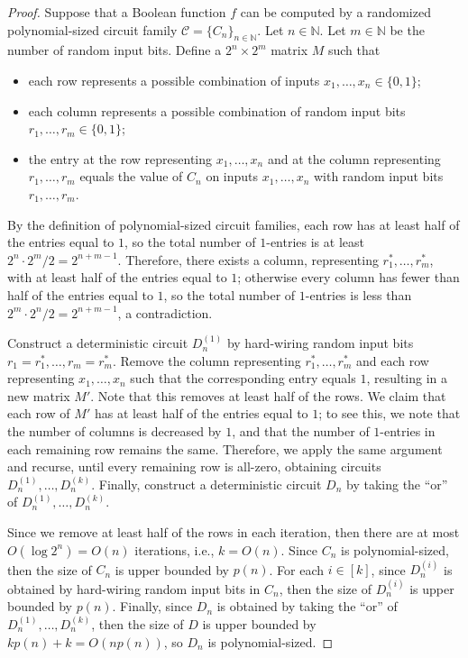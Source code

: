 \documentclass[letterpaper, reqno,11pt]{article}
\newcommand{\NN}{\mathbb{N}}
\begin{document}
\begin{enumerate}
  \begin{proof}
    Suppose that a Boolean function $f$ can be computed by a randomized polynomial-sized circuit family $\mathcal C = \{ C_n \}_{n \in \NN}$. Let $n \in \NN$. Let $m \in \NN$ be the number of random input bits. Define a $2^n \times 2^m$ matrix $M$ such that
    \begin{itemize}[itemsep=0pt]
      \item each row represents a possible combination of inputs $x_1, \ldots, x_n \in \{ 0, 1 \}$;
      \item each column represents a possible combination of random input bits $r_1, \ldots, r_m \in \{ 0, 1 \}$;
      \item the entry at the row representing $x_1, \ldots, x_n$ and at the column representing $r_1, \ldots, r_m$ equals the value of $C_n$ on inputs $x_1, \ldots, x_n$ with random input bits $r_1, \ldots, r_m$.
    \end{itemize}
    By the definition of polynomial-sized circuit families, each row has at least half of the entries equal to $1$, so the total number of $1$-entries is at least $2^n \cdot 2^m/2 = 2^{n + m - 1}$. Therefore, there exists a column, representing $r_1^*, \ldots, r_m^*$, with at least half of the entries equal to $1$; otherwise every column has fewer than half of the entries equal to $1$, so the total number of $1$-entries is less than $2^m \cdot 2^n/2 = 2^{n + m - 1}$, a contradiction.

    Construct a deterministic circuit $D_n^{(1)}$ by hard-wiring random input bits $r_1 = r_1^*, \ldots, r_m = r_m^*$. Remove the column representing $r_1^*, \ldots, r_m^*$ and each row representing $x_1, \ldots, x_n$ such that the corresponding entry equals $1$, resulting in a new matrix $M'$. Note that this removes at least half of the rows. We claim that each row of $M'$ has at least half of the entries equal to $1$; to see this, we note that the number of columns is decreased by $1$, and that the number of $1$-entries in each remaining row remains the same. Therefore, we apply the same argument and recurse, until every remaining row is all-zero, obtaining circuits $D_n^{(1)}, \ldots, D_n^{(k)}$. Finally, construct a deterministic circuit $D_n$ by taking the ``or'' of $D_n^{(1)}, \ldots, D_n^{(k)}$.

    Since we remove at least half of the rows in each iteration, then there are at most $O(\log 2^n) = O(n)$ iterations, i.e., $k = O(n)$. Since $C_n$ is polynomial-sized, then the size of $C_n$ is upper bounded by $p(n)$. For each $i \in [k]$, since $D_n^{(i)}$ is obtained by hard-wiring random input bits in $C_n$, then the size of $D_n^{(i)}$ is upper bounded by $p(n)$. Finally, since $D_n$ is obtained by taking the ``or'' of $D_n^{(1)}, \ldots, D_n^{(k)}$, then the size of $D$ is upper bounded by $kp(n) + k = O(np(n))$, so $D_n$ is polynomial-sized.


\end{proof}
\end{enumerate}
\end{document}
